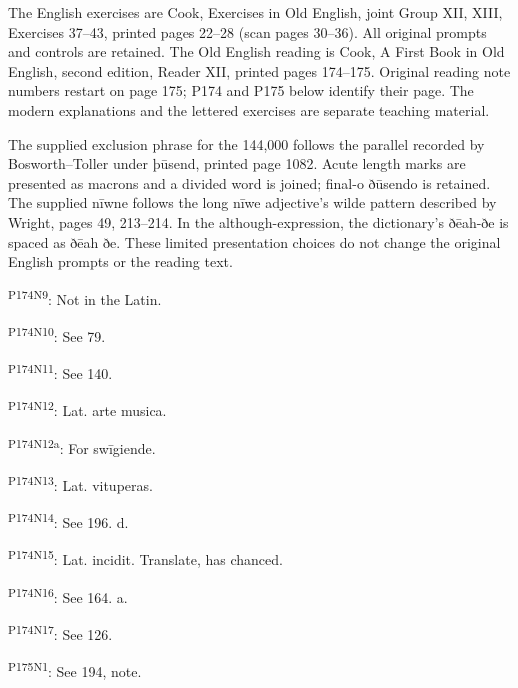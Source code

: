 \begingroup\fontsize{10}{12.8}\selectfont
\setlength{\parskip}{1.5pt}
The English exercises are Cook, Exercises in Old English, joint Group XII, XIII, Exercises 37–43, printed pages 22–28 (scan pages 30–36). All original prompts and controls are retained. The Old English reading is Cook, A First Book in Old English, second edition, Reader XII, printed pages 174–175. Original reading note numbers restart on page 175; P174 and P175 below identify their page. The modern explanations and the lettered exercises are separate teaching material.

The supplied exclusion phrase for the 144,000 follows the parallel recorded by Bosworth–Toller under þūsend, printed page 1082. Acute length marks are presented as macrons and a divided word is joined; final-o ðūsendo is retained. The supplied nīwne follows the long nīwe adjective’s wilde pattern described by Wright, pages 49, 213–214. In the although-expression, the dictionary’s ðēah-ðe is spaced as ðēah ðe. These limited presentation choices do not change the original English prompts or the reading text.

\textsuperscript{P174N9}: Not in the Latin.

\textsuperscript{P174N10}: See 79.

\textsuperscript{P174N11}: See 140.

\textsuperscript{P174N12}: Lat. arte musica.

\textsuperscript{P174N12a}: For swīgiende.

\textsuperscript{P174N13}: Lat. vituperas.

\textsuperscript{P174N14}: See 196. d.

\textsuperscript{P174N15}: Lat. incidit. Translate, has chanced.

\textsuperscript{P174N16}: See 164. a.

\textsuperscript{P174N17}: See 126.

\textsuperscript{P175N1}: See 194, note.

